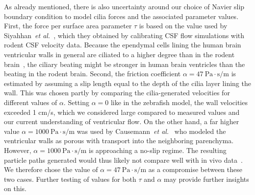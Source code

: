 \documentclass{template}
\begin{document}
As already mentioned, there is also uncertainty around our choice
of Navier slip boundary condition to model cilia forces and the associated parameter values.
First, the force per surface area parameter $\tau$ is based on the value used by
Siyahhan~\emph{et al.}~\citep{Siyahhan2014FlowVentricles}, which they obtained by
calibrating CSF flow simulations with rodent CSF velocity data. Because the
ependymal cells lining the human brain ventricular walls
in general are ciliated to a higher degree than in the rodent brain~\citep{spassky2017development},
the ciliary beating might be stronger in human brain ventricles
than the beating in the rodent brain. Second,
the friction coefficient $\alpha=47 \ \mathrm{Pa\cdot s/m}$
is estimated by assuming a slip length equal to the depth of the cilia layer lining
the wall. This was chosen partly by comparing the cilia-generated velocities for
different values of $\alpha$. Setting $\alpha=0$ like in the zebrafish model,
the wall velocities exceeded 1 cm/s, which we considered large compared to measured
values and our current understanding of ventricular flow.
On the other hand, a far higher value $\alpha=1000 \ \mathrm{Pa\cdot s/m}$
was used by Causemann~\emph{et al.}~\citep{Causemann2022HumanFramework}
who modeled the ventricular walls as porous with transport into the neighboring
parenchyma. However, $\alpha=1000 \ \mathrm{Pa\cdot s/m}$
is approaching a no-slip regime. The resulting
particle paths generated would thus likely not compare well with
in vivo data~\citep{stadlbauer2010insight}. We therefore
chose the value of $\alpha=47 \ \mathrm{Pa\cdot s/m}$ as a 
compromise between these two cases. Further testing of values for
both $\tau$ and $\alpha$ may provide further insights on this.
\end{document}
